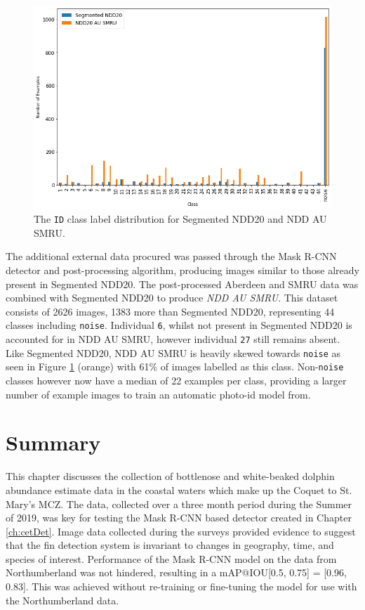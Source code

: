 \begin{figure}
	\begin{center}
		\includegraphics[scale=0.5]{Chapter4/figs/seg-ndd20-and-ndd20-au-smru-dist}
	\end{center}
	\caption{The \texttt{ID} class label distribution for Segmented NDD20 and NDD AU SMRU.}
	\label{fig:segmented-ndd20-and-ndd20-au-smru-dist}
\end{figure}

The additional external data procured was passed through the Mask R-CNN detector and post-processing algorithm, producing images similar to those already present in Segmented NDD20. The post-processed Aberdeen and SMRU data was combined with Segmented NDD20 to produce \textit{NDD AU SMRU}. This dataset consists of 2626 images, 1383 more than Segmented NDD20, representing 44 classes including \texttt{noise}. Individual \texttt{6}, whilst not present in Segmented NDD20 is accounted for in NDD AU SMRU, however individual \texttt{27} still remains absent. Like Segmented NDD20, NDD AU SMRU is heavily skewed towards \texttt{noise} as seen in Figure \ref{fig:segmented-ndd20-and-ndd20-au-smru-dist} (orange) with 61\% of images labelled as this class. Non-\texttt{noise} classes however now have a median of 22 examples per class, providing a larger number of example images to train an automatic photo-id model from. 

\section{Summary}\label{ch:NDD,sec:summary}

This chapter discusses the collection of bottlenose and white-beaked dolphin abundance estimate data in the coastal waters which make up the Coquet to St. Mary's MCZ. The data, collected over a three month period during the Summer of 2019, was key for testing the Mask R-CNN based detector created in Chapter \ref{ch:cetDet}. Image data collected during the surveys provided evidence to suggest that the fin detection system is invariant to changes in geography, time, and species of interest. Performance of the Mask R-CNN model on the data from Northumberland was not hindered, resulting in a mAP@IOU[0.5, 0.75] = [0.96, 0.83]. This was achieved without re-training or fine-tuning the model for use with the Northumberland data. 

